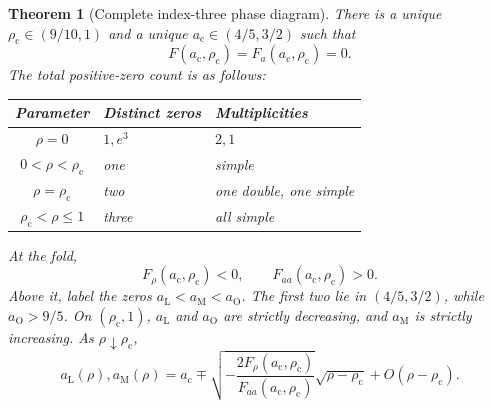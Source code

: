 \documentclass[11pt]{article}
\numberwithin{equation}{section}
\newtheorem{theorem}{Theorem}[section]
\theoremstyle{definition}
\newcommand{\lc}{\rho_{\mathrm c}}
\newcommand{\ac}{a_{\mathrm c}}
\newcommand{\aL}{a_{\mathrm L}}
\newcommand{\aM}{a_{\mathrm M}}
\newcommand{\aO}{a_{\mathrm O}}
\begin{document}
\begin{theorem}[Complete index-three phase diagram]\label{thm:phase}
There is a unique $\lc\in(9/10,1)$ and a unique $\ac\in(4/5,3/2)$ such that
\[
 F(\ac,\lc)=F_a(\ac,\lc)=0.
\]
The total positive-zero count is as follows:
\begin{center}
\begin{tabular}{cll}
\toprule
Parameter & Distinct zeros & Multiplicities\\
\midrule
$\rho=0$ & $1,e^3$ & $2,1$\\
$0<\rho<\lc$ & one & simple\\
$\rho=\lc$ & two & one double, one simple\\
$\lc<\rho\leq1$ & three & all simple\\
\bottomrule
\end{tabular}
\end{center}
At the fold,
\begin{equation}\label{eq:foldnondeg}
 F_\rho(\ac,\lc)<0,\qquad F_{aa}(\ac,\lc)>0.
\end{equation}
Above it, label the zeros $\aL<\aM<\aO$. The first two lie in $(4/5,3/2)$,
while $\aO>9/5$. On $(\lc,1)$, $\aL$ and $\aO$ are strictly decreasing,
and $\aM$ is strictly increasing. As $\rho\downarrow\lc$,
\begin{equation}\label{eq:foldexp}
 \aL(\rho),\aM(\rho)=\ac\mp
 \sqrt{-\frac{2F_\rho(\ac,\lc)}{F_{aa}(\ac,\lc)}}\sqrt{\rho-\lc}
 +O(\rho-\lc).
\end{equation}
\end{theorem}
\end{document}
